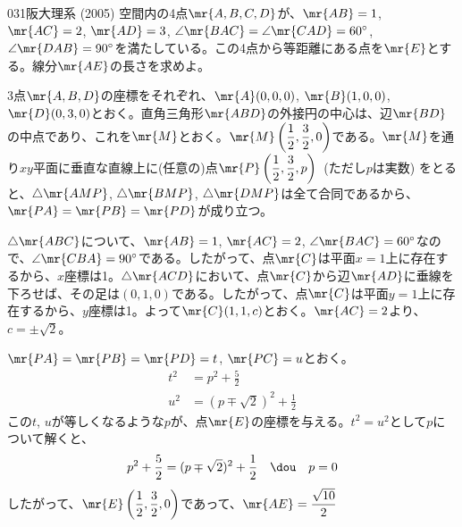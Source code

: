 \begin{thm}{031}{}{阪大理系 (2005)}
 空間内の4点$\mr{A, B, C, D}$が、$\mr{AB}=1$, $\mr{AC}=2$, $\mr{AD}=3$, $\angle\mr{BAC}=\angle\mr{CAD}=60^\circ$, $\angle\mr{DAB}=90^\circ$を満たしている。この4点から等距離にある点を$\mr{E}$とする。線分$\mr{AE}$の長さを求めよ。
\end{thm}

3点$\mr{A, B, D}$の座標をそれぞれ、$\mr{A}(0, 0, 0)$, $\mr{B}(1, 0, 0)$, $\mr{D}(0, 3, 0)$とおく。直角三角形$\mr{ABD}$の外接円の中心は、辺$\mr{BD}$の中点であり、これを$\mr{M}$とおく。$\mr{M}\left(\dfrac{1}{2}, \dfrac{3}{2}, 0\right)$である。$\mr{M}$を通り$xy$平面に垂直な直線上に(任意の)点$\mr{P}\left(\dfrac{1}{2}, \dfrac{3}{2}, p\right)$~(ただし$p$は実数) をとると、$\triangle\mr{AMP}$, $\triangle
\mr{BMP}$, $\triangle\mr{DMP}$は全て合同であるから、$\mr{PA}=\mr{PB}=\mr{PD}$が成り立つ。

$\triangle\mr{ABC}$について、$\mr{AB}=1$, $\mr{AC}=2$, $\angle\mr{BAC}=60^\circ$なので、$\angle\mr{CBA}=90^\circ$である。したがって、点$\mr{C}$は平面$x=1$上に存在するから、$x$座標は1。$\triangle\mr{ACD}$において、点$\mr{C}$から辺$\mr{AD}$に垂線を下ろせば、その足は$(0, 1, 0)$である。したがって、点$\mr{C}$は平面$y=1$上に存在するから、$y$座標は1。よって$\mr{C}(1, 1, c)$とおく。$\mr{AC}=2$より、$c=\pm\sqrt{2}$。

$\mr{PA}=\mr{PB}=\mr{PD}=t$, $\mr{PC}=u$とおく。
\begin{align*}
 t^2&=p^2+\frac{5}{2} \\
 u^2&=(p\mp\sqrt{2})^2+\frac{1}{2}
\end{align*}
この$t$, $u$が等しくなるような$p$が、点$\mr{E}$の座標を与える。$t^2=u^2$として$p$について解くと、
\[ p^2+\frac{5}{2}=(p\mp\sqrt{2})^2+\frac{1}{2} \quad\dou\quad p=0 \]
したがって、$\mr{E}\left(\dfrac{1}{2}, \dfrac{3}{2}, 0\right)$であって、$\mr{AE}=\dfrac{\sqrt{10}}{2}$
